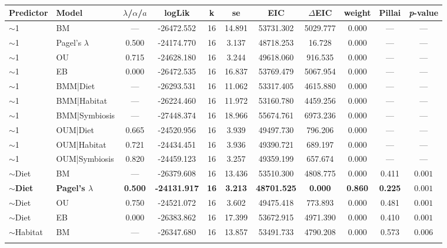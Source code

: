 \begin{table}
\centering
\caption{\label{tab:mvgls_col_morpho}}
\centering
\begin{tabular}[t]{llccccccccc}
\toprule
Predictor & Model & $\lambda$/$\alpha$/$a$ & logLik & k & se & EIC & $\Delta$EIC & weight & Pillai & \textit{p}-value\\
\midrule
$\sim$1 & BM & --- & -26472.552 & 16 & 14.891 & 53731.302 & 5029.777 & 0.000 & --- & ---\\
$\sim$1 & Pagel's $\lambda$ & 0.500 & -24174.770 & 16 & 3.137 & 48718.253 & 16.728 & 0.000 & --- & ---\\
$\sim$1 & OU & 0.715 & -24628.180 & 16 & 3.244 & 49618.060 & 916.535 & 0.000 & --- & ---\\
$\sim$1 & EB & 0.000 & -26472.535 & 16 & 16.837 & 53769.479 & 5067.954 & 0.000 & --- & ---\\
$\sim$1 & BMM|Diet & --- & -26293.531 & 16 & 11.062 & 53317.405 & 4615.880 & 0.000 & --- & ---\\
\addlinespace
$\sim$1 & BMM|Habitat & --- & -26224.460 & 16 & 11.972 & 53160.780 & 4459.256 & 0.000 & --- & ---\\
$\sim$1 & BMM|Symbiosis & --- & -27448.374 & 16 & 18.966 & 55674.761 & 6973.236 & 0.000 & --- & ---\\
$\sim$1 & OUM|Diet & 0.665 & -24520.956 & 16 & 3.939 & 49497.730 & 796.206 & 0.000 & --- & ---\\
$\sim$1 & OUM|Habitat & 0.721 & -24434.451 & 16 & 3.936 & 49390.721 & 689.197 & 0.000 & --- & ---\\
$\sim$1 & OUM|Symbiosis & 0.820 & -24459.123 & 16 & 3.257 & 49359.199 & 657.674 & 0.000 & --- & ---\\
\addlinespace
$\sim$Diet & BM & --- & -26379.608 & 16 & 13.436 & 53510.300 & 4808.775 & 0.000 & 0.411 & $0.001$\\
\textbf{$\sim$Diet} & \textbf{Pagel's $\lambda$} & \textbf{0.500} & \textbf{-24131.917} & \textbf{16} & \textbf{3.213} & \textbf{48701.525} & \textbf{0.000} & \textbf{0.860} & \textbf{0.225} & \textbf{$0.001$}\\
$\sim$Diet & OU & 0.750 & -24521.072 & 16 & 3.602 & 49475.418 & 773.893 & 0.000 & 0.481 & $0.001$\\
$\sim$Diet & EB & 0.000 & -26383.862 & 16 & 17.399 & 53672.915 & 4971.390 & 0.000 & 0.410 & $0.001$\\
$\sim$Habitat & BM & --- & -26347.680 & 16 & 13.857 & 53491.733 & 4790.208 & 0.000 & 0.573 & $0.006$\\
\addlinespace

\end{tabular}
\end{table}
